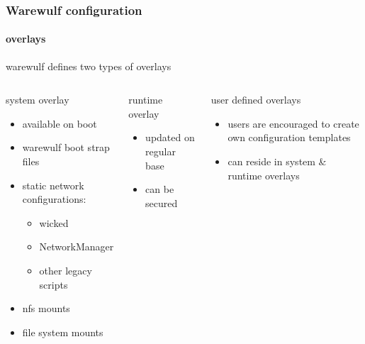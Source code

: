 \documentclass[aspectratio=169]{beamer}
\begin{document}
\begin{frame}[fragile]
\frametitle{Warewulf configuration}
\framesubtitle{overlays}
warewulf defines two types of overlays
\begin{columns}
\begin{block}{system overlay}
\begin{itemize}
  \item available on boot
  \item warewulf boot strap files
  \item static network configurations:
  \begin{itemize}
    \item wicked
    \item NetworkManager
    \item other legacy scripts
  \end{itemize}
  \item nfs mounts
  \item file system mounts
\end{itemize}
\end{block}
\begin{block}{runtime overlay}
\begin{itemize}
  \item updated on regular base
  \item can be secured
\end{itemize}
\end{block}
\begin{block}{user defined overlays}
\begin{itemize}
  \item users are encouraged to create own configuration templates
  \item can reside in system \& runtime overlays
\end{itemize}
\end{block}
\end{columns}
\end{frame}
\end{document}
